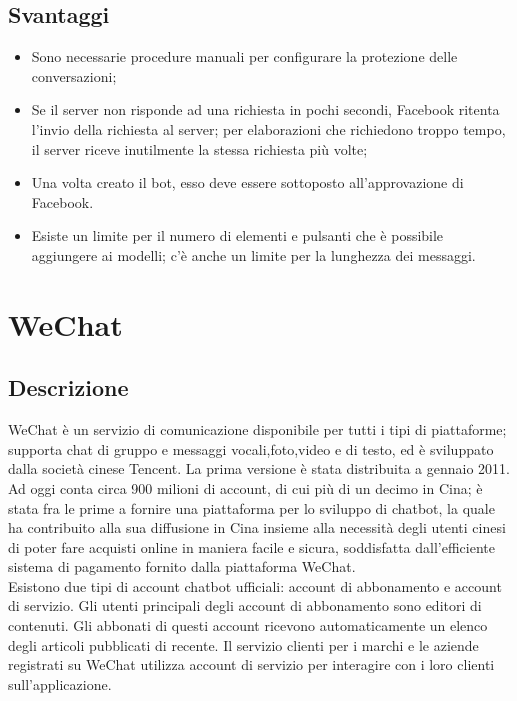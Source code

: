 \documentclass[11pt,notitlepage]{article}
\begin{document}
\subsection*{Svantaggi}
\begin{itemize}
		\item Sono necessarie procedure manuali per configurare la protezione delle conversazioni;
		\item Se il server non risponde ad una richiesta in pochi secondi, Facebook ritenta l'invio della richiesta al server; per elaborazioni che richiedono troppo tempo, il server riceve inutilmente la stessa richiesta più volte;
		\item Una volta creato il bot, esso deve essere sottoposto all'approvazione di Facebook.
		\item Esiste un limite per il numero di elementi e pulsanti che è possibile aggiungere ai modelli; c'è anche un limite per la lunghezza dei messaggi.
\end{itemize} 

\bigskip
\section*{WeChat}
\subsection*{Descrizione}
WeChat è un servizio di comunicazione disponibile per tutti i tipi di piattaforme; supporta chat di gruppo e messaggi vocali,foto,video e di testo,  ed è sviluppato dalla società cinese Tencent. La prima versione è stata distribuita a gennaio 2011. \\
Ad oggi conta circa 900 milioni di account, di cui più di un decimo in Cina; è stata fra le prime a fornire una piattaforma per lo sviluppo di chatbot, la quale ha contribuito alla sua diffusione in Cina insieme alla necessità degli utenti cinesi di poter fare acquisti online in maniera facile e sicura, soddisfatta dall'efficiente sistema di pagamento fornito dalla piattaforma WeChat. \\
Esistono due tipi di account chatbot ufficiali: account di abbonamento e account di servizio. Gli utenti principali degli account di abbonamento sono editori di contenuti. Gli abbonati di questi account ricevono automaticamente un elenco degli articoli pubblicati di recente. Il servizio clienti per i marchi e le aziende registrati su WeChat utilizza account di servizio per interagire con i loro clienti sull'applicazione.
\end{document}
